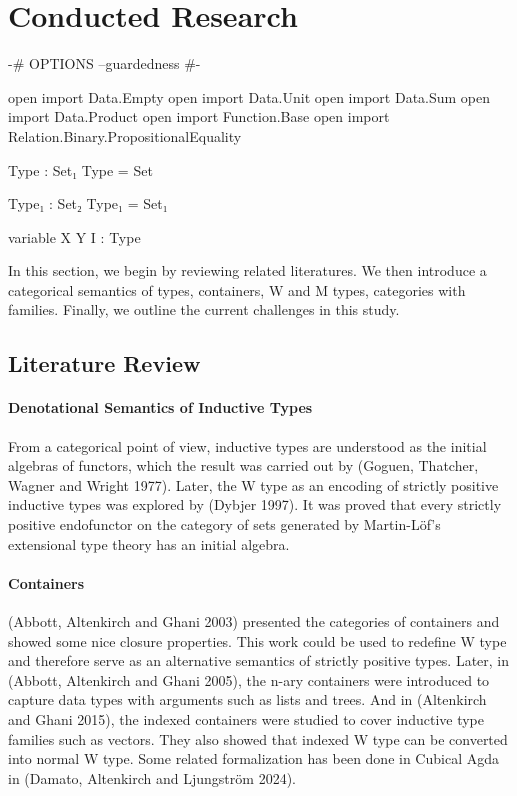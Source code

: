\chapter{Conducted Research}

\begin{code}[hide]
{-# OPTIONS --guardedness #-}

open import Data.Empty
open import Data.Unit
open import Data.Sum
open import Data.Product
open import Function.Base
open import Relation.Binary.PropositionalEquality

Type : Set₁
Type = Set

Type₁ : Set₂
Type₁ = Set₁

variable X Y I : Type
\end{code}

In this section, we begin by reviewing related literatures. We then introduce a categorical semantics of types, containers, W and M types, categories with families. Finally, we outline the current challenges in this study.

\section{Literature Review}

\subsubsection*{Denotational Semantics of Inductive Types}

From a categorical point of view, inductive types are understood as the initial algebras of functors, which the result was carried out by (Goguen, Thatcher, Wagner and Wright 1977)\cite{goguen1977initial}. Later, the W type as an encoding of strictly positive inductive types was explored by (Dybjer 1997)\cite{dybjer1997representing}. It was proved that every strictly positive endofunctor on the category of sets generated by Martin-Löf's extensional type theory has an initial algebra.

\subsubsection*{Containers}

(Abbott, Altenkirch and Ghani 2003)\cite{abbott2003categories} presented the categories of containers and showed some nice closure properties. This work could be used to redefine W type and therefore serve as an alternative semantics of strictly positive types. Later, in (Abbott, Altenkirch and Ghani 2005)\cite{abbott2005containers}, the n-ary containers were introduced to capture data types with arguments such as lists and trees. And in (Altenkirch and Ghani 2015), the indexed containers were studied to cover inductive type families such as vectors. They also showed that indexed W type can be converted into normal W type. Some related formalization has been done in Cubical Agda in (Damato, Altenkirch and Ljungström 2024)\cite{damato2024formalising}.

